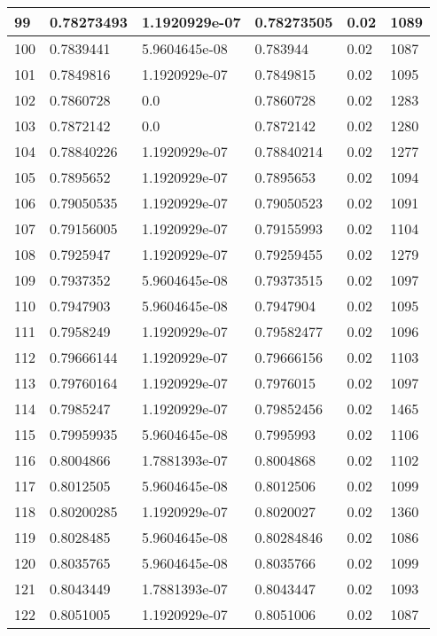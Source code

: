 \begin{longtable}{|l|l|l|l|l|l|}
99 & 0.78273493 & 1.1920929e-07 & 0.78273505 & 0.02 & 1089 \\ \hline 
100 & 0.7839441 & 5.9604645e-08 & 0.783944 & 0.02 & 1087 \\ \hline 
101 & 0.7849816 & 1.1920929e-07 & 0.7849815 & 0.02 & 1095 \\ \hline 
102 & 0.7860728 & 0.0 & 0.7860728 & 0.02 & 1283 \\ \hline 
103 & 0.7872142 & 0.0 & 0.7872142 & 0.02 & 1280 \\ \hline 
104 & 0.78840226 & 1.1920929e-07 & 0.78840214 & 0.02 & 1277 \\ \hline 
105 & 0.7895652 & 1.1920929e-07 & 0.7895653 & 0.02 & 1094 \\ \hline 
106 & 0.79050535 & 1.1920929e-07 & 0.79050523 & 0.02 & 1091 \\ \hline 
107 & 0.79156005 & 1.1920929e-07 & 0.79155993 & 0.02 & 1104 \\ \hline 
108 & 0.7925947 & 1.1920929e-07 & 0.79259455 & 0.02 & 1279 \\ \hline 
109 & 0.7937352 & 5.9604645e-08 & 0.79373515 & 0.02 & 1097 \\ \hline 
110 & 0.7947903 & 5.9604645e-08 & 0.7947904 & 0.02 & 1095 \\ \hline 
111 & 0.7958249 & 1.1920929e-07 & 0.79582477 & 0.02 & 1096 \\ \hline 
112 & 0.79666144 & 1.1920929e-07 & 0.79666156 & 0.02 & 1103 \\ \hline 
113 & 0.79760164 & 1.1920929e-07 & 0.7976015 & 0.02 & 1097 \\ \hline 
114 & 0.7985247 & 1.1920929e-07 & 0.79852456 & 0.02 & 1465 \\ \hline 
115 & 0.79959935 & 5.9604645e-08 & 0.7995993 & 0.02 & 1106 \\ \hline 
116 & 0.8004866 & 1.7881393e-07 & 0.8004868 & 0.02 & 1102 \\ \hline 
117 & 0.8012505 & 5.9604645e-08 & 0.8012506 & 0.02 & 1099 \\ \hline 
118 & 0.80200285 & 1.1920929e-07 & 0.8020027 & 0.02 & 1360 \\ \hline 
119 & 0.8028485 & 5.9604645e-08 & 0.80284846 & 0.02 & 1086 \\ \hline 
120 & 0.8035765 & 5.9604645e-08 & 0.8035766 & 0.02 & 1099 \\ \hline 
121 & 0.8043449 & 1.7881393e-07 & 0.8043447 & 0.02 & 1093 \\ \hline 
122 & 0.8051005 & 1.1920929e-07 & 0.8051006 & 0.02 & 1087 \\ \hline 

\end{longtable}
